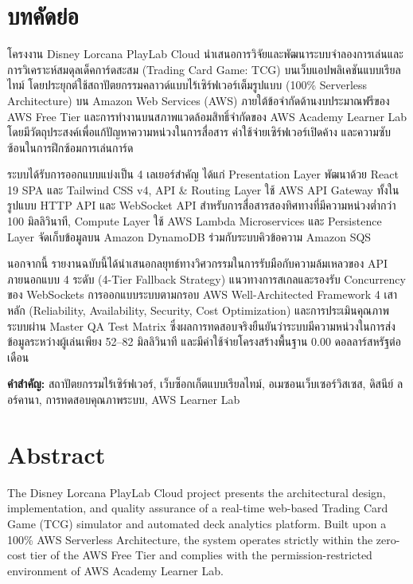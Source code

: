\documentclass[12pt,a4paper]{report}
\begin{document}
\setcounter{page}{1}

\chapter*{บทคัดย่อ}
โครงงาน Disney Lorcana PlayLab Cloud นำเสนอการวิจัยและพัฒนาระบบจำลองการเล่นและการวิเคราะห์สมดุลเด็คการ์ดสะสม (Trading Card Game: TCG) บนเว็บแอปพลิเคชันแบบเรียลไทม์ โดยประยุกต์ใช้สถาปัตยกรรมคลาวด์แบบไร้เซิร์ฟเวอร์เต็มรูปแบบ (100\% Serverless Architecture) บน Amazon Web Services (AWS) ภายใต้ข้อจำกัดด้านงบประมาณฟรีของ AWS Free Tier และการทำงานบนสภาพแวดล้อมสิทธิ์จำกัดของ AWS Academy Learner Lab โดยมีวัตถุประสงค์เพื่อแก้ปัญหาความหน่วงในการสื่อสาร ค่าใช้จ่ายเซิร์ฟเวอร์เปิดค้าง และความซับซ้อนในการฝึกซ้อมการเล่นการ์ด

ระบบได้รับการออกแบบแบ่งเป็น 4 เลเยอร์สำคัญ ได้แก่ Presentation Layer พัฒนาด้วย React 19 SPA และ Tailwind CSS v4, API \& Routing Layer ใช้ AWS API Gateway ทั้งในรูปแบบ HTTP API และ WebSocket API สำหรับการสื่อสารสองทิศทางที่มีความหน่วงต่ำกว่า 100 มิลลิวินาที, Compute Layer ใช้ AWS Lambda Microservices และ Persistence Layer จัดเก็บข้อมูลบน Amazon DynamoDB ร่วมกับระบบคิวข้อความ Amazon SQS 

นอกจากนี้ รายงานฉบับนี้ได้นำเสนอกลยุทธ์ทางวิศวกรรมในการรับมือกับความล้มเหลวของ API ภายนอกแบบ 4 ระดับ (4-Tier Fallback Strategy) แนวทางการสเกลและรองรับ Concurrency ของ WebSockets การออกแบบระบบตามกรอบ AWS Well-Architected Framework 4 เสาหลัก (Reliability, Availability, Security, Cost Optimization) และการประเมินคุณภาพระบบผ่าน Master QA Test Matrix ซึ่งผลการทดสอบจริงยืนยันว่าระบบมีความหน่วงในการส่งข้อมูลระหว่างผู้เล่นเพียง 52--82 มิลลิวินาที และมีค่าใช้จ่ายโครงสร้างพื้นฐาน 0.00 ดอลลาร์สหรัฐต่อเดือน

\vspace{0.8cm}
\noindent \textbf{คำสำคัญ:} สถาปัตยกรรมไร้เซิร์ฟเวอร์, เว็บซ็อกเก็ตแบบเรียลไทม์, อเมซอนเว็บเซอร์วิสเซส, ดิสนีย์ ลอร์คานา, การทดสอบคุณภาพระบบ, AWS Learner Lab

\newpage

\chapter*{Abstract}
The Disney Lorcana PlayLab Cloud project presents the architectural design, implementation, and quality assurance of a real-time web-based Trading Card Game (TCG) simulator and automated deck analytics platform. Built upon a 100\% AWS Serverless Architecture, the system operates strictly within the zero-cost tier of the AWS Free Tier and complies with the permission-restricted environment of AWS Academy Learner Lab.
\end{document}
